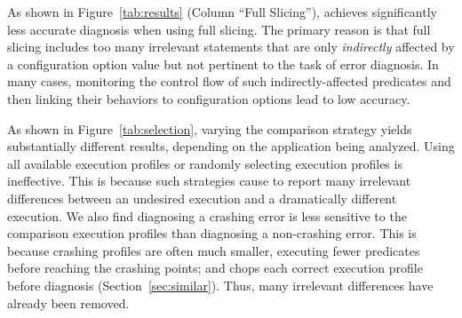 As shown in Figure~\ref{tab:results}  (Column ``Full Slicing''),
\ourtool achieves significantly less accurate diagnosis when using
full slicing. The primary reason is that full slicing includes
too many irrelevant statements that are only \textit{indirectly} affected by
a configuration option value but not pertinent to the task of
error diagnosis. In many cases, monitoring the control flow
of such indirectly-affected predicates and then linking their
behaviors to configuration options lead to low accuracy.



As shown in Figure~\ref{tab:selection}, varying the comparison
strategy yields substantially different results,
depending on the application being analyzed.
Using all available execution profiles or randomly
selecting execution profiles is ineffective. This is because
such strategies cause \ourtool to report many irrelevant
differences between an undesired
execution and a dramatically different execution.
We also find diagnosing a crashing error is less sensitive 
to the comparison execution profiles than diagnosing a non-crashing error.
This is because crashing profiles are often much smaller, executing
fewer predicates before reaching the crashing points; and \ourtool
chops each correct execution profile before diagnosis (Section~\ref{sec:similar}).
Thus, many irrelevant differences have already been removed.




